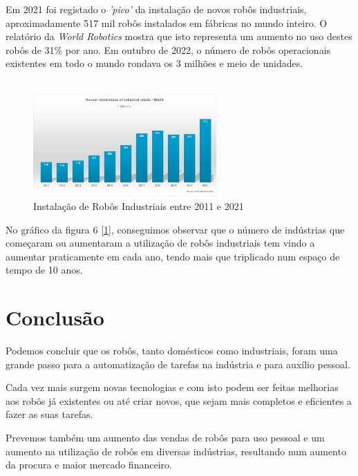 \documentclass[10pt]{article}
\begin{document}
 Em 2021 foi registado o \emph{'pico'} da instalação de novos robôs industriais, aproximadamente 517 mil robôs instalados em fábricas no mundo inteiro. O relatório da \emph{World Robotics} mostra que isto representa um aumento no uso destes robôs de 31\% por ano. Em outubro de 2022, o número de robôs operacionais existentes em todo o mundo rondava os 3 milhões e meio de unidades.
\\
\\
\begin{figure}[h]
\centering
\label{Instalação de robôs industriais}
\includegraphics[width = 7cm]{img/grafico-industriais.jpg}
\caption{Instalação de Robôs Industriais entre 2011 e 2021}
\end{figure}

No gráfico da figura 6 [\ref{Instalação de robôs industriais}], conseguimos observar que o número de indústrias que começaram ou aumentaram a utilização de robôs industriais tem vindo a aumentar praticamente em cada ano, tendo mais que triplicado num espaço de tempo de 10 anos.


\section{Conclusão}
\hspace{\parindent}Podemos concluir que os robôs, tanto domésticos como industriais, foram uma grande passo para a automatização de tarefas na indústria e para auxílio pessoal.

Cada vez mais surgem novas tecnologias e com isto podem ser feitas melhorias aos robôs já existentes ou até criar novos, que sejam mais completos e eficientes a fazer as suas tarefas.

Prevemos também um aumento das vendas de robôs para uso pessoal e um aumento na utilização de robôs em diversas indústrias, resultando num aumento da procura e maior mercado financeiro.

\newpage

\printbibliography[title=Referências]  
\end{document}
